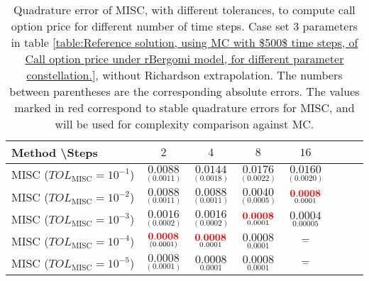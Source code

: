 \begin{table}[h!]
	\centering
	\begin{tabular}{l*{6}{c}r}
		Method \textbackslash  Steps            & $2$ & $4$ & $8$ & $16$  \\
		\hline
		MISC ($TOL_{\text{MISC}}=10^{-1}$)  & $\underset{(   0.0011)}{\mathbf{  0.0088}}$ & $\underset{(
			0.0018)}{\mathbf{ 0.0144}}$& $\underset{( 0.0022)}{\mathbf{0.0176}}$  & $\underset{(  0.0020)}{\mathbf{ 0.0160}}$   \\
		MISC ($TOL_{\text{MISC}}=10^{-2}$)  & $\underset{(   0.0011)}{\mathbf{  0.0088}}$ & $\underset{(0.0011
			)}{\mathbf{ 0.0088
		}}$ & $\underset{(0.0005)}{\mathbf{ 0.0040
		}}$ & $\underset{0.0001}{\mathbf{{\color{red}0.0008}}}$  \\
		MISC ($TOL_{\text{MISC}}=10^{-3}$)  & $\underset{( 0.0002)}{\mathbf{    0.0016}}$ & $\underset{(0.0002
			)}{\mathbf{ 0.0016
		}}$ & $\underset{0.0001}{\mathbf{{\color{red}0.0008}}}$ & $\underset{0.00005}{\mathbf{0.0004}}$ \\
		MISC ($TOL_{\text{MISC}}=10^{-4}$)  & $\underset{( 0.0001)}{\mathbf{    {\color{red}0.0008}}}$ & $\underset{0.0001}{\mathbf{{\color{red}0.0008}}}$& $\underset{0.0001}{\mathbf{0.0008}}$ & $\underset{-}{\mathbf{-}}$  \\
		
		MISC ($TOL_{\text{MISC}}=10^{-5}$)  & $\underset{( 0.0001)}{\mathbf{    0.0008}}$ & $\underset{0.0001}{\mathbf{0.0008}}$& $\underset{0.0001}{\mathbf{0.0008}}$ & $\underset{-}{\mathbf{-}}$  \\
		
		\hline
		
	\end{tabular}
	\caption{Quadrature error of MISC, with different tolerances,  to compute call option price  for different number of time steps. Case  set $3$ parameters in table \ref{table:Reference solution, using MC with $500$ time steps, of Call option price under rBergomi model, for different parameter constellation.}, without Richardson extrapolation. The numbers between parentheses are the corresponding absolute errors. The values marked in red correspond to stable quadrature errors for MISC, and will be used for complexity comparison against MC.}
	\label{Quadrature error of MISC to compute Call option price of the different tolerances for different number of time steps. Case  set $3$ parameters, without Richardson extrapolation. The numbers between parentheses are the corresponding absolute errors.}
\end{table}


